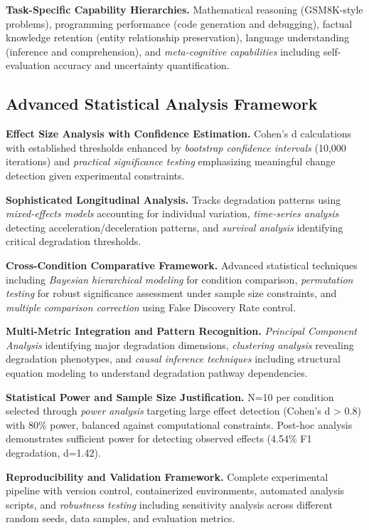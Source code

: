 \documentclass{article}
\begin{document}
\textbf{Task-Specific Capability Hierarchies.} Mathematical reasoning (GSM8K-style problems), programming performance (code generation and debugging), factual knowledge retention (entity relationship preservation), language understanding (inference and comprehension), and \textit{meta-cognitive capabilities} including self-evaluation accuracy and uncertainty quantification.

\subsection{Advanced Statistical Analysis Framework}

\textbf{Effect Size Analysis with Confidence Estimation.} Cohen's d calculations with established thresholds enhanced by \textit{bootstrap confidence intervals} (10,000 iterations) and \textit{practical significance testing} emphasizing meaningful change detection given experimental constraints.

\textbf{Sophisticated Longitudinal Analysis.} Tracks degradation patterns using \textit{mixed-effects models} accounting for individual variation, \textit{time-series analysis} detecting acceleration/deceleration patterns, and \textit{survival analysis} identifying critical degradation thresholds.

\textbf{Cross-Condition Comparative Framework.} Advanced statistical techniques including \textit{Bayesian hierarchical modeling} for condition comparison, \textit{permutation testing} for robust significance assessment under sample size constraints, and \textit{multiple comparison correction} using False Discovery Rate control.

\textbf{Multi-Metric Integration and Pattern Recognition.} \textit{Principal Component Analysis} identifying major degradation dimensions, \textit{clustering analysis} revealing degradation phenotypes, and \textit{causal inference techniques} including structural equation modeling to understand degradation pathway dependencies.

\textbf{Statistical Power and Sample Size Justification.} N=10 per condition selected through \textit{power analysis} targeting large effect detection (Cohen's d > 0.8) with 80\% power, balanced against computational constraints. Post-hoc analysis demonstrates sufficient power for detecting observed effects (4.54\% F1 degradation, d=1.42).

\textbf{Reproducibility and Validation Framework.} Complete experimental pipeline with version control, containerized environments, automated analysis scripts, and \textit{robustness testing} including sensitivity analysis across different random seeds, data samples, and evaluation metrics.
\end{document}
